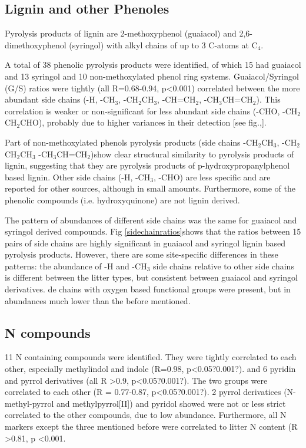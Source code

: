 \documentclass[preprint,12pt]{elsarticle}
\begin{document}
\subsection{Lignin and other Phenoles}

Pyrolysis products of lignin are 2-methoxyphenol (guaiacol) and 2,6-dimethoxyphenol (syringol) with alkyl chains of up to 3 C-atoms at C$_4$.

A total of 38 phenolic pyrolysis products were identified, of which 15 had guaiacol and 13 syringol and 10 non-methoxylated phenol ring systems. Guaiacol/Syringol (G/S) ratios were tightly (all R=0.68-0.94, p<0.001) correlated between the more abundant side chains (-H, -CH$_3$, -CH$_2$CH$_3$, -CH=CH$_2$, -CH$_3$CH=CH$_2$). This correlation is weaker or non-significant for less abundant side chains (-CHO, -CH$_2$CH$_2$CHO), probably due to higher variances in their detection [see fig.,]. 

Part of non-methoxylated phenols pyrolysis products (side chains -CH$_2$CH$_3$, -CH$_2$CH$_2$CH$_3$ -CH$_3$CH=CH$_2$)show clear structural similarity to pyrolysis products of lignin, suggesting that they are pyrolysis products of p-hydroxypropanylphenol based lignin. Other side chains (-H, -CH$_3$, -CHO) are less specific and are reported for other sources, although in small amounts. Furthermore, some of the phenolic compounds (i.e. hydroxyquinone) are not lignin derived. 


The pattern of abundances of different side chains was the same for guaiacol and syringol derived compounds. Fig \ref{sidechainratios}shows that the ratios between 15 pairs of side chains are highly significant in guaiacol and syringol lignin based pyrolysis products. However, there are some site-specific differences in these patterns: the abundance of -H and -CH$_3$ side chains relative to other side chains is different between the litter types, but consistent between guaiacol and syringol derivatives. 
  de chains with oxygen based functional groups were present, but in abundances much lower than the before mentioned. 

\subsection{N compounds}

11 N containing compounds were identified. They were tightly correlated to each other, especially methylindol and indole (R=0.98, p\textless 0.05?0.001?). and 6 pyridin and pyrrol derivatives (all R \textgreater 0.9, p\textless 0.05?0.001?). The two groups were correlated to each other (R = 0.77-0.87, p\textless 0.05?0.001?). 2 pyrrol derivatices (N-methyl-pyrrol and methylpyrrol[II]) and pyridol showed were not or less strict correlated to the other compounds, due to low abundance. Furthermore, all N markers except the three mentioned before were correlated to litter N content (R \textgreater 0.81, p \textless 0.001.
\end{document}

